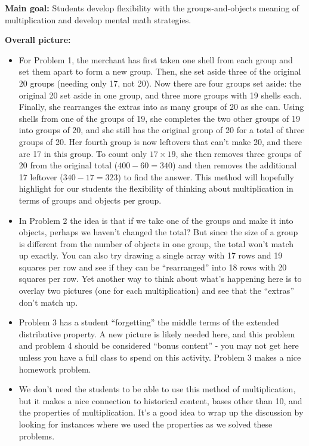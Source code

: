\documentclass[nooutcomes, noauthor, handout]{ximera}
\begin{document}
\newpage
\begin{instructorNotes}
{\bf Main goal:} Students develop flexibility with the groups-and-objects meaning of multiplication and develop mental math strategies.


{\bf Overall picture:} 
\begin{itemize}
	\item For Problem 1, the merchant has first taken one shell from each group and set them apart to form a new group. Then, she set aside three of the original 20 groups (needing only 17, not 20). Now there are four groups set aside: the original 20 set aside in one group, and three more groups with 19 shells each. Finally, she rearranges the extras into as many groups of 20 as she can. Using shells from one of the groups of 19, she completes the two other groups of 19 into groups of 20, and she still has the original group of 20 for a total of three groups of 20. Her fourth group is now leftovers that can't make 20, and there are 17 in this group. To count only $17\times 19$, she then removes three groups of 20 from the original total ($400 - 60 = 340$) and then removes the additional 17 leftover ($340 - 17 = 323$) to find the answer. This method will hopefully highlight for our students the flexibility of thinking about multiplication in terms of groups and objects per group.
	\item In Problem 2 the idea is that if we take one of the groups and make it into objects, perhaps we haven't changed the total? But since the size of a group is different from the number of objects in one group, the total won't match up exactly. You can also try drawing a single array with 17 rows and 19 squares per row and see if they can be ``rearranged'' into 18 rows with 20 squares per row. Yet another way to think about what's happening here is to overlay two pictures (one for each multiplication) and see that the ``extras'' don't match up.
	\item Problem 3 has a student ``forgetting'' the middle terms of the extended distributive property. A new picture is likely needed here, and this problem and problem 4 should be considered ``bonus content'' - you may not get here unless you have a full class to spend on this activity. Problem 3 makes a nice homework problem.
	\item We don't need the students to be able to use this method of multiplication, but it makes a nice connection to historical content, bases other than 10, and the properties of multiplication. It's a good idea to wrap up the discussion by looking for instances where we used the properties as we solved these problems.


\end{itemize}
\end{instructorNotes}
\end{document}
